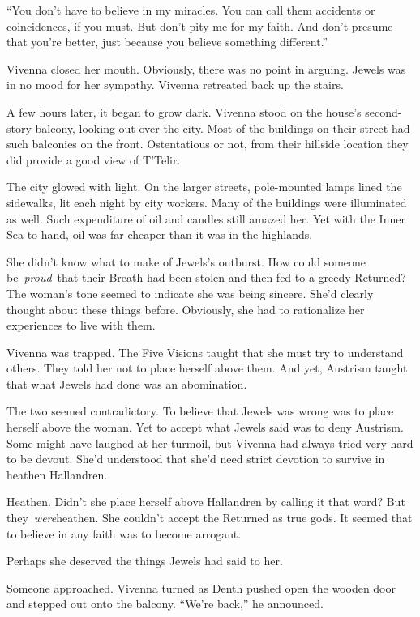 “You don’t have to believe in my miracles. You can call them accidents or coincidences, if you must. But don’t pity me for my faith. And don’t presume that you’re better, just because you believe something different.”

Vivenna closed her mouth. Obviously, there was no point in arguing. Jewels was in no mood for her sympathy. Vivenna retreated back up the stairs.

\orn

A few hours later, it began to grow dark. Vivenna stood on the house’s second-story balcony, looking out over the city. Most of the buildings on their street had such balconies on the front. Ostentatious or not, from their hillside location they did provide a good view of T’Telir.

The city glowed with light. On the larger streets, pole-mounted lamps lined the sidewalks, lit each night by city workers. Many of the buildings were illuminated as well. Such expenditure of oil and candles still amazed her. Yet with the Inner Sea to hand, oil was far cheaper than it was in the highlands.

She didn’t know what to make of Jewels’s outburst. How could someone be~\textit{proud}~that their Breath had been stolen and then fed to a greedy Returned? The woman’s tone seemed to indicate she was being sincere. She’d clearly thought about these things before. Obviously, she had to rationalize her experiences to live with them.

Vivenna was trapped. The Five Visions taught that she must try to understand others. They told her not to place herself above them. And yet, Austrism taught that what Jewels had done was an abomination.

The two seemed contradictory. To believe that Jewels was wrong was to place herself above the woman. Yet to accept what Jewels said was to deny Austrism. Some might have laughed at her turmoil, but Vivenna had always tried very hard to be devout. She’d understood that she’d need strict devotion to survive in heathen Hallandren.

Heathen. Didn’t she place herself above Hallandren by calling it that word? But they~\textit{were}heathen. She couldn’t accept the Returned as true gods. It seemed that to believe in any faith was to become arrogant.

Perhaps she deserved the things Jewels had said to her.

Someone approached. Vivenna turned as Denth pushed open the wooden door and stepped out onto the balcony. “We’re back,” he announced.

